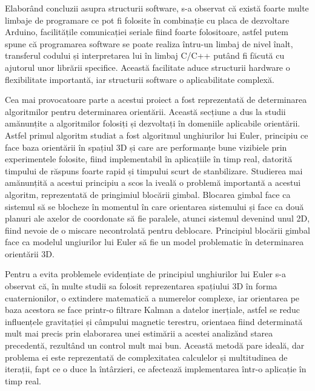 \-\hspace{1cm}Elaborând concluzii asupra structurii software, s-a observat că există foarte multe limbaje de programare ce pot fi folosite în combinație cu placa de dezvoltare Arduino, facilitățile comunicației seriale fiind foarte folositoare, astfel putem spune că programarea software se poate realiza întru-un limbaj de nivel înalt, transferul codului și interpretarea lui în limbaj C/C++ putând fi făcută cu ajutorul unor librării specifice. Această facilitate aduce structurii hardware o flexibilitate importantă, iar structurii software o aplicabilitate complexă.

\-\hspace{1cm}Cea mai provocatoare parte a acestui proiect a fost reprezentată de determinarea algoritmilor pentru determinarea orientării. Această secțiune a dus la studii amănunțite a algoritmilor folosiți și dezvoltați în domeniile aplicabile orientării. Astfel primul algoritm studiat a fost algoritmul unghiurilor lui Euler, principiu ce face baza orientării în spațiul 3D și care are performanțe bune vizibiele prin experimentele folosite, fiind implementabil în aplicațiile în timp real, datorită timpului de răspuns foarte rapid și timpului scurt de stanbilizare.
Studierea mai amănunțită a acestui principiu a scos la iveală o problemă importantă a acestui algoritm, reprezentată de pringimiul blocării gimbal. Blocarea gimbal face ca sistemul să se blocheze în momentul în care orientarea sistemului și face ca două planuri ale axelor de coordonate să fie paralele, atunci sistemul devenind unul 2D, fiind nevoie de o miscare necontrolată pentru deblocare. Principiul blocării gimbal face ca modelul ungiurilor lui Euler să fie un model problematic în determinarea orientării 3D.

\-\hspace{1cm}Pentru a evita problemele evidențiate de principiul unghiurilor lui Euler s-a observat că, în multe studii sa folosit reprezentarea spațiului 3D în forma cuaternionilor, o extindere matematică a numerelor complexe, iar orientarea pe baza acestora se face printr-o filtrare Kalman a datelor inerțiale, astfel se reduc influențele gravitației și câmpului magnetic terestru, orientaea fiind determinată mult mai precis prin elaborarea unei estimării a acestei analizănd starea precedentă, rezultând un control mult mai bun. Această metodă pare ideală, dar problema ei este reprezentată de complexitatea calculelor și multitudinea de iterații, fapt ce o duce la întârzieri, ce afectează implementarea într-o aplicație în timp real.

